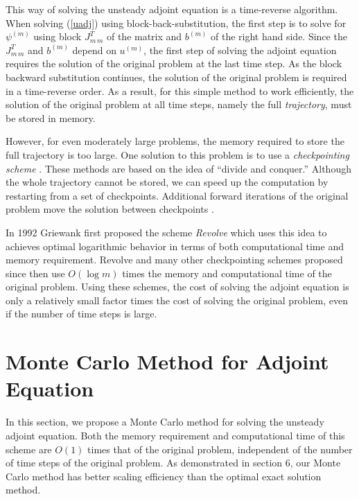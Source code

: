 \documentclass[a4paper,11pt]{article}
\theoremstyle{remark}
\theoremstyle{definition}
\begin{document}
    This way of solving the unsteady adjoint equation is a time-reverse
    algorithm.  When solving (\ref{uadj}) using block-back-substitution,
    the first step is to solve for $\psi^{(m)}$ using block $J_{m\,m}^T$
    of the matrix and $b^{(m)}$ of the right hand side.  Since the
    $J_{m\,m}^T$ and $b^{(m)}$ depend on $u^{(m)}$, the first step of
    solving the adjoint equation requires the solution of the original
    problem at the last time step.  As the block backward substitution
    continues, the solution of the original problem is required in a
    time-reverse order.  As a result, for this simple method to work
    efficiently, the solution of the original problem at all time steps,
    namely the full \emph{trajectory}, must be stored in memory.
    
    However, for even moderately large problems, the memory required to
    store the full trajectory is too large.  One solution to this problem
    is to use a \emph{checkpointing scheme} \cite{Griewank1992,Griewank2003,
    Griewank2004}.  These methods are based on the idea of ``divide
    and conquer.''  Although the whole trajectory cannot be stored,
    we can speed up the computation by restarting from a set of checkpoints.
    Additional forward iterations of the original problem move the solution
    between checkpoints \cite{Charpentier2001}.
    
    In 1992 Griewank \cite{Griewank1992} first proposed the scheme
    \emph{Revolve} which uses this idea to achieves optimal logarithmic
    behavior in terms of both computational time and memory requirement.
    Revolve and many other checkpointing schemes proposed since then use
    $O(\log m)$ times the memory and computational time of the original
    problem.  Using these schemes, the cost of solving the adjoint equation
    is only a relatively small factor times the cost of solving the original
    problem, even if the number of time steps is large.





\section{Monte Carlo Method for Adjoint Equation}
    In this section, we propose a Monte Carlo method for solving the unsteady
    adjoint equation.  Both the memory requirement and computational time of
    this scheme are $O(1)$ times that of the original problem, independent
    of the number of time steps of the original problem.  As demonstrated
    in section 6, our Monte Carlo method has better scaling efficiency than
    the optimal exact solution method.
    
\end{document}
